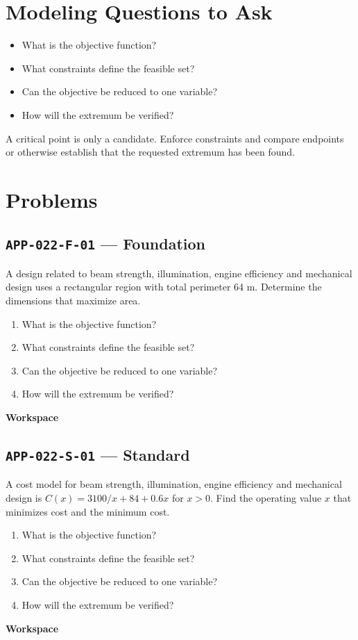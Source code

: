 \documentclass[11pt]{book}
\newcommand{\pid}[1]{\texttt{#1}}
\newcommand{\workspace}{\par\vspace{0.7in}\hrulefill\par\vspace{0.55in}\hrulefill\par}
\begin{document}
\section*{Modeling Questions to Ask}\begin{itemize}
\item What is the objective function?
\item What constraints define the feasible set?
\item Can the objective be reduced to one variable?
\item How will the extremum be verified?
\end{itemize}
\begin{errorbox}A critical point is only a candidate. Enforce constraints and compare endpoints or otherwise establish that the requested extremum has been found.\end{errorbox}
\section*{Problems}
\subsection*{\pid{APP-022-F-01} — Foundation}
\begin{problembox}
A design related to beam strength, illumination, engine efficiency and mechanical design uses a rectangular region with total perimeter 64 m. Determine the dimensions that maximize area.
\end{problembox}
\begin{promptbox}\begin{enumerate}
\item What is the objective function?
\item What constraints define the feasible set?
\item Can the objective be reduced to one variable?
\item How will the extremum be verified?
\end{enumerate}\end{promptbox}
\textbf{Workspace}\workspace
{}
\subsection*{\pid{APP-022-S-01} — Standard}
\begin{problembox}
A cost model for beam strength, illumination, engine efficiency and mechanical design is $C(x)=3100/x+84+0.6x$ for $x>0$. Find the operating value $x$ that minimizes cost and the minimum cost.
\end{problembox}
\begin{promptbox}\begin{enumerate}
\item What is the objective function?
\item What constraints define the feasible set?
\item Can the objective be reduced to one variable?
\item How will the extremum be verified?
\end{enumerate}\end{promptbox}
\textbf{Workspace}\workspace
{}
\end{document}
